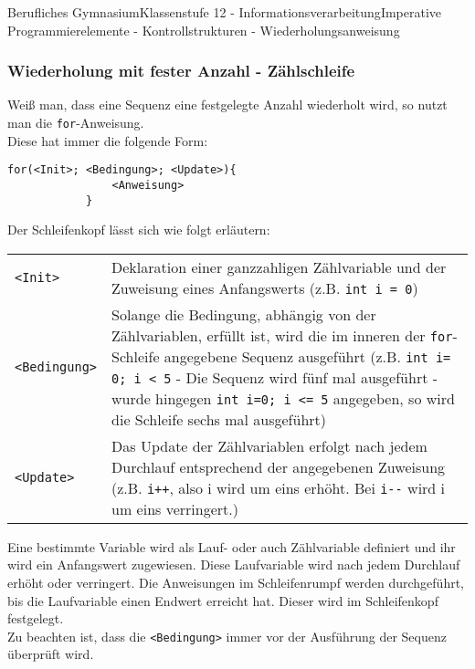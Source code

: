 \documentclass[11pt,oneside,openany,headings=optiontotoc,11pt,numbers=noenddot]{article}
\begin{document}
\begin{worksheet}{Berufliches Gymnasium}{Klassenstufe 12 - Informationsverarbeitung}{Imperative Programmierelemente - Kontrollstrukturen - Wiederholungsanweisung}
		\subsubsection{Wiederholung mit fester Anzahl - Zählschleife}
		Weiß man, dass eine Sequenz eine festgelegte Anzahl wiederholt wird, so nutzt man die \lstinline[style=JavaInputStyle]|for|-Anweisung.\\
		Diese hat immer die folgende Form:
		\begin{lstlisting}[style=JavaInputStyle]
			for(<Init>; <Bedingung>; <Update>){
				<Anweisung>
			}
		\end{lstlisting}
		\par\bigskip\noindent
		Der Schleifenkopf lässt sich wie folgt erläutern:\\
		\begin{tabularx}{\textwidth}{lX}
			{\lstinline[style=JavaInputStyle]|<Init>|} & Deklaration einer ganzzahligen Zählvariable und der Zuweisung eines Anfangswerts (z.B. {\lstinline[style=JavaInputStyle]|int i = 0|})\\
			{\lstinline[style=JavaInputStyle]|<Bedingung>|} & Solange die Bedingung, abhängig von der Zählvariablen, erfüllt ist, wird die im inneren der {\lstinline[style=JavaInputStyle]{for}}-Schleife angegebene Sequenz ausgeführt (z.B. {\lstinline[style=JavaInputStyle]|int i= 0; i < 5|} - Die Sequenz wird fünf mal ausgeführt - wurde hingegen {\lstinline[style=JavaInputStyle]|int i=0; i <= 5|} angegeben, so wird die Schleife sechs mal ausgeführt)\\
			{\lstinline[style=JavaInputStyle]|<Update>|} & Das Update der Zählvariablen erfolgt nach jedem Durchlauf entsprechend der angegebenen Zuweisung (z.B. {\lstinline[style=JavaInputStyle]|i++|}, also i wird um eins erhöht. Bei {\lstinline[style=JavaInputStyle]|i--|} wird i um eins verringert.)
		\end{tabularx}
		Eine bestimmte Variable wird als Lauf- oder auch Zählvariable definiert und ihr wird ein Anfangswert zugewiesen. Diese Laufvariable wird nach jedem Durchlauf erhöht oder verringert. Die Anweisungen im Schleifenrumpf werden durchgeführt, bis die Laufvariable einen Endwert erreicht hat. Dieser wird im Schleifenkopf festgelegt.\\
		Zu beachten ist, dass die {\lstinline[style=JavaInputStyle]|<Bedingung>|} immer vor der Ausführung der Sequenz überprüft wird.\\
		\par\noindent
		\begin{minipage}[t]{0.48\textwidth}

\end{minipage}
\end{worksheet}
\end{document}
